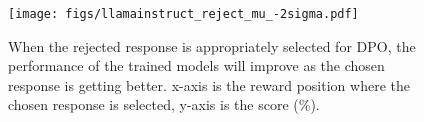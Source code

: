 \begin{figure}[!ht]
\centering
\texttt{[image: figs/llamainstruct\_reject\_mu\_-2sigma.pdf]}
\caption{When the rejected response is appropriately selected for DPO, the performance of the trained models will improve as the chosen response is getting better. x-axis is the reward position where the chosen response is selected, y-axis is the score (\%).}
\label{rejected_mu_-2sgima}
\vspace{-1em}
\end{figure}